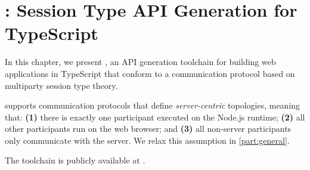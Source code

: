 \chapter{: Session Type API Generation for TypeScript}
\label{chap:codegen}

In this chapter, we present
, an API generation toolchain for building
web applications in TypeScript that conform to a communication protocol 
based on multiparty session type theory.

 supports communication protocols that define 
\emph{server-centric} topologies, meaning that: 
\textbf{(1)} there is exactly one participant executed on the 
Node.js runtime; 
\textbf{(2)} all other participants run on the web browser; and
\textbf{(3)} all non-server participants only communicate with the server.
We relax this assumption in \cref{part:general}.

The toolchain is publicly available at \cite{repo}.









